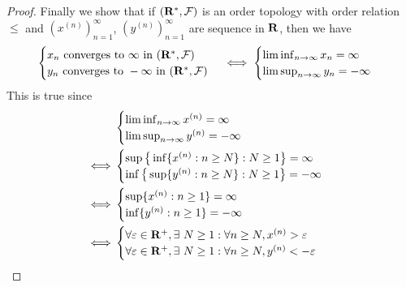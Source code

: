 \begin{proof}
    Finally we show that if  \((\mathbf{R}^*, \mathcal{F})\) is an order topology with order relation \(\leq\) and \((x^{(n)})_{n = 1}^\infty\), \((y^{(n)})_{n = 1}^\infty\) are sequence in \(\mathbf{R}\), then we have
    \[
        \begin{cases}
            x_n \text{ converges to } \infty \text{ in } (\mathbf{R}^*, \mathcal{F})  \\
            y_n \text{ converges to } -\infty \text{ in } (\mathbf{R}^*, \mathcal{F}) \\
        \end{cases} \iff \begin{cases}
            \liminf_{n \to \infty} x_n = \infty \\
            \limsup_{n \to \infty} y_n = -\infty
        \end{cases}
    \]
    This is true since
    \begin{align*}
             & \begin{cases}
                   \liminf_{n \to \infty} x^{(n)} = \infty \\
                   \limsup_{n \to \infty} y^{(n)} = -\infty
               \end{cases}                                                                                       \\
        \iff & \begin{cases}
                   \sup\big\{\inf\{x^{(n)} : n \geq N\} : N \geq 1\big\} = \infty \\
                   \inf\big\{\sup\{y^{(n)} : n \geq N\} : N \geq 1\big\} = -\infty
               \end{cases}                                                                \\
        \iff & \begin{cases}
                   \sup\{x^{(n)} : n \geq 1\} = \infty \\
                   \inf\{y^{(n)} : n \geq 1\} = -\infty
               \end{cases}                                                                                           \\
        \iff & \begin{cases}
                   \forall \varepsilon \in \R^+, \exists\ N \geq 1 : \forall n \geq N, x^{(n)} > \varepsilon \\
                   \forall \varepsilon \in \R^+, \exists\ N \geq 1 : \forall n \geq N, y^{(n)} < -\varepsilon
               \end{cases}                                     \\

\end{align*}
\end{proof}
